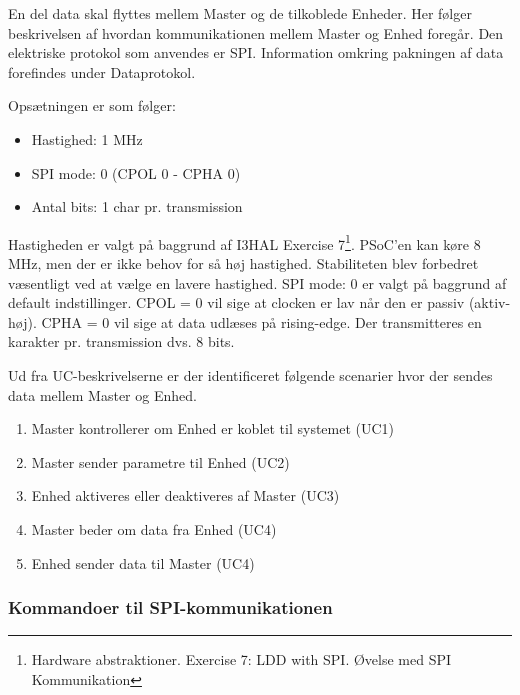 
En del data skal flyttes mellem Master og de tilkoblede Enheder. Her følger beskrivelsen af hvordan kommunikationen mellem Master og Enhed foregår. Den elektriske protokol som anvendes er SPI.
Information omkring pakningen af data forefindes under Dataprotokol.

Opsætningen er som følger:

\begin{itemize}
  \item Hastighed: 1 MHz
  \item SPI mode: 0 (CPOL 0 - CPHA 0)
  \item Antal bits: 1 char pr. transmission
\end{itemize}

Hastigheden er valgt på baggrund af I3HAL Exercise 7\footnote{Hardware abstraktioner. Exercise 7: LDD with SPI. Øvelse med SPI Kommunikation}. PSoC'en kan køre 8 MHz, men der er ikke behov for så høj hastighed. Stabiliteten blev forbedret væsentligt ved at vælge en lavere hastighed. 
\newline SPI mode: 0 er valgt på baggrund af default indstillinger. 
\newline CPOL = 0 vil sige at clocken er lav når den er passiv (aktiv-høj). 
\newline CPHA = 0 vil sige at data udlæses på rising-edge. 
\newline Der transmitteres en karakter pr. transmission dvs. 8 bits.

Ud fra UC-beskrivelserne er der identificeret følgende scenarier hvor der sendes data mellem Master og Enhed.

\begin{enumerate}
	\item Master kontrollerer om Enhed er koblet til systemet (UC1)
	\item Master sender parametre til Enhed (UC2)
	\item Enhed aktiveres eller deaktiveres af Master (UC3)
	\item Master beder om data fra Enhed (UC4)
	\item Enhed sender data til Master (UC4)
\end{enumerate}


\subsubsection*{Kommandoer til SPI-kommunikationen}

